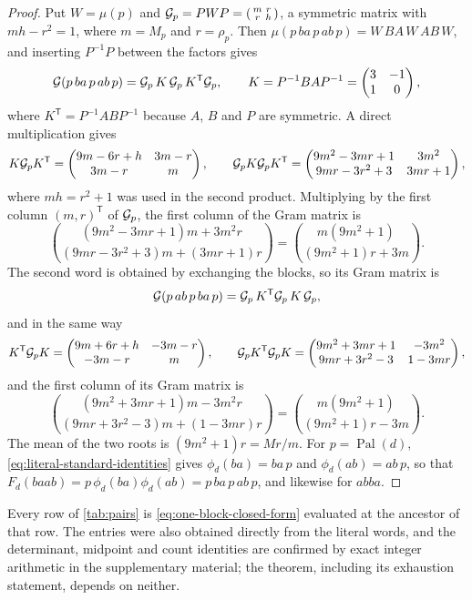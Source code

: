 \begin{proof}
Put $W=\mu(p)$ and $\mathcal{G}_p=PWP=\left(\begin{smallmatrix}m&r\\r&h\end{smallmatrix}\right)$, a
symmetric matrix with $mh-r^2=1$, where $m=M_p$ and $r=\rho_p$. Then
$\mu(p\,ba\,p\,ab\,p)=W\,BA\,W\,AB\,W$, and inserting $P^{-1}P$ between the factors gives
$$
 \mathcal{G}(p\,ba\,p\,ab\,p)=\mathcal{G}_p\,K\,\mathcal{G}_p\,K^{\mathsf T}\mathcal{G}_p,
 \qquad
 K=P^{-1}BAP^{-1}=\begin{pmatrix}3&-1\\1&0\end{pmatrix},
$$
where $K^{\mathsf T}=P^{-1}ABP^{-1}$ because $A$, $B$ and $P$ are symmetric. A direct multiplication gives
$$
 K\mathcal{G}_pK^{\mathsf T}=\begin{pmatrix}9m-6r+h&3m-r\\3m-r&m\end{pmatrix},
 \qquad
 \mathcal{G}_pK\mathcal{G}_pK^{\mathsf T}=\begin{pmatrix}9m^2-3mr+1&3m^2\\9mr-3r^2+3&3mr+1\end{pmatrix},
$$
where $mh=r^2+1$ was used in the second product. Multiplying by the first column
$(m,r)^{\mathsf T}$ of $\mathcal{G}_p$, the first column of the Gram matrix is
$$
 \binom{(9m^2-3mr+1)m+3m^2r}{(9mr-3r^2+3)m+(3mr+1)r}
 =\binom{m(9m^2+1)}{(9m^2+1)r+3m}.
$$
The second word is obtained by exchanging the blocks, so its Gram matrix is
$$
 \mathcal{G}(p\,ab\,p\,ba\,p)=\mathcal{G}_p\,K^{\mathsf T}\mathcal{G}_p\,K\,\mathcal{G}_p ,
$$
and in the same way
$$
 K^{\mathsf T}\mathcal{G}_pK=\begin{pmatrix}9m+6r+h&-3m-r\\-3m-r&m\end{pmatrix},
 \qquad
 \mathcal{G}_pK^{\mathsf T}\mathcal{G}_pK=\begin{pmatrix}9m^2+3mr+1&-3m^2\\9mr+3r^2-3&1-3mr\end{pmatrix},
$$
and the first column of its Gram matrix is
$$
 \binom{(9m^2+3mr+1)m-3m^2r}{(9mr+3r^2-3)m+(1-3mr)r}
 =\binom{m(9m^2+1)}{(9m^2+1)r-3m}.
$$
The mean of the two roots is $(9m^2+1)r=Mr/m$. For $p=\operatorname{Pal}(d)$, \eqref{eq:literal-standard-identities}
gives $\phi_d(ba)=ba\,p$ and $\phi_d(ab)=ab\,p$, so that
$F_d(baab)=p\,\phi_d(ba)\phi_d(ab)=p\,ba\,p\,ab\,p$, and likewise for $abba$.
\end{proof}

Every row of \cref{tab:pairs} is \eqref{eq:one-block-closed-form}
evaluated at the ancestor of that row. The entries were also obtained
directly from the literal words, and the determinant, midpoint and count
identities are confirmed by exact integer arithmetic in the
supplementary material; the theorem, including its exhaustion statement,
depends on neither.

